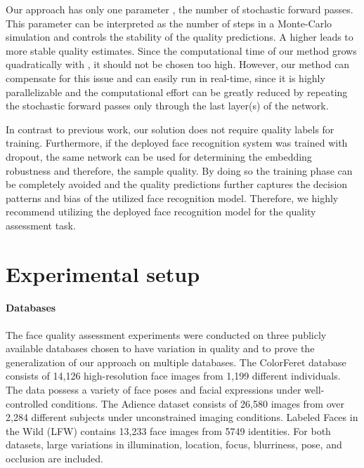 \documentclass[10pt,twocolumn,letterpaper]{article}
\begin{document}
Our approach has only one parameter , the number of stochastic forward passes.
This parameter can be interpreted as the number of steps in a Monte-Carlo simulation and controls the stability of the quality predictions.
A higher  leads to more stable quality estimates.
Since the computational time  of our method grows quadratically with ,
it should not be chosen too high.
However, our method can compensate for this issue and can easily run in real-time, since it is highly parallelizable and the computational effort can be greatly reduced by repeating the stochastic forward passes only through the last layer(s) of the network.


In contrast to previous work, our solution does not require quality labels for training.
Furthermore, if the deployed face recognition system was trained with dropout, the same network can be used for determining the embedding robustness and therefore, the sample quality.
By doing so the training phase can be completely avoided and the quality predictions further captures the decision patterns and bias of the utilized face recognition model. 
Therefore, we highly recommend utilizing the deployed face recognition model for the quality assessment task.










 






\section{Experimental setup} 
\label{sec:ExperimentalSetup}


\paragraph{Databases}
The face quality assessment experiments were conducted on three publicly available databases chosen to have variation in quality and to prove the generalization of our approach on multiple databases.
The ColorFeret database \cite{ColorFERET} consists of 14,126 high-resolution face images from 1,199 different individuals.
The data possess a variety of face poses and facial expressions under well-controlled conditions.
The Adience dataset \cite{Eidinger:2014:AGE:2771306.2772049} consists of 26,580 images from over 2,284 different subjects under unconstrained imaging conditions.
Labeled Faces in the Wild (LFW) \cite{LFWTech} contains 13,233 face images from 5749 identities.
For both datasets, large variations in illumination, location, focus, blurriness, pose, and occlusion are included.
\end{document}
